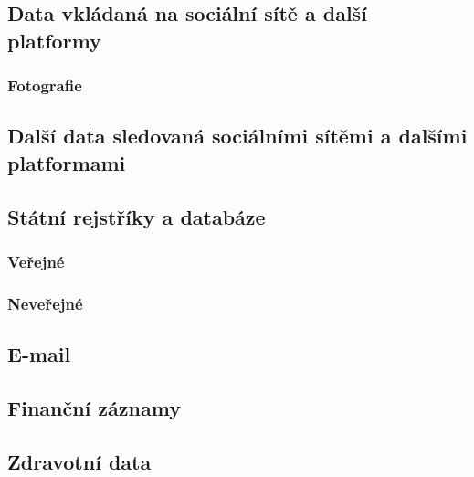 \subsection{Data vkládaná na sociální sítě a další platformy}
\subsubsection{Fotografie}

\subsection{Další data sledovaná sociálními sítěmi a dalšími platformami}

\subsection{Státní rejstříky a databáze}
\subsubsection{Veřejné}
\subsubsection{Neveřejné}

\subsection{E-mail}

\subsection{Finanční záznamy}

\subsection{Zdravotní data}